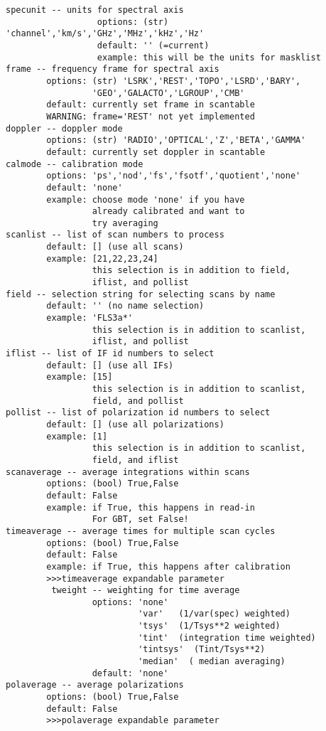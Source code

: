 \begin{verbatim}
specunit -- units for spectral axis
                  options: (str) 'channel','km/s','GHz','MHz','kHz','Hz'
                  default: '' (=current)
                  example: this will be the units for masklist
frame -- frequency frame for spectral axis
        options: (str) 'LSRK','REST','TOPO','LSRD','BARY',
                 'GEO','GALACTO','LGROUP','CMB'
        default: currently set frame in scantable
        WARNING: frame='REST' not yet implemented    
doppler -- doppler mode
        options: (str) 'RADIO','OPTICAL','Z','BETA','GAMMA'
        default: currently set doppler in scantable
calmode -- calibration mode
        options: 'ps','nod','fs','fsotf','quotient','none'
        default: 'none'
        example: choose mode 'none' if you have
                 already calibrated and want to
                 try averaging
scanlist -- list of scan numbers to process
        default: [] (use all scans)
        example: [21,22,23,24]
                 this selection is in addition to field,
                 iflist, and pollist
field -- selection string for selecting scans by name
        default: '' (no name selection)
        example: 'FLS3a*'
                 this selection is in addition to scanlist,
                 iflist, and pollist
iflist -- list of IF id numbers to select
        default: [] (use all IFs)
        example: [15]
                 this selection is in addition to scanlist,
                 field, and pollist
pollist -- list of polarization id numbers to select
        default: [] (use all polarizations)
        example: [1]
                 this selection is in addition to scanlist,
                 field, and iflist
scanaverage -- average integrations within scans
        options: (bool) True,False
        default: False
        example: if True, this happens in read-in
                 For GBT, set False!
timeaverage -- average times for multiple scan cycles
        options: (bool) True,False
        default: False
        example: if True, this happens after calibration
        >>>timeaverage expandable parameter
         tweight -- weighting for time average
                 options: 'none'
                          'var'   (1/var(spec) weighted)
                          'tsys'  (1/Tsys**2 weighted)
                          'tint'  (integration time weighted)
                          'tintsys'  (Tint/Tsys**2)
                          'median'  ( median averaging)
                 default: 'none'
polaverage -- average polarizations
        options: (bool) True,False
        default: False
        >>>polaverage expandable parameter

\end{verbatim}
